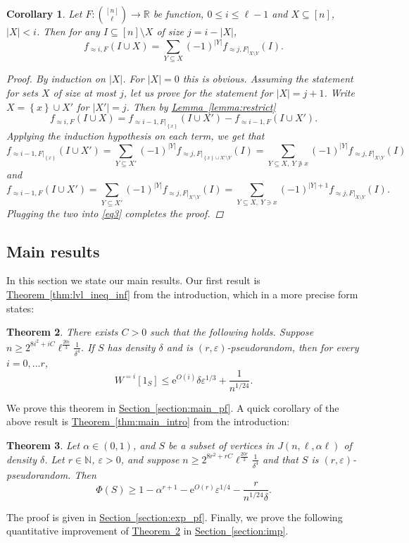 \documentclass[11pt]{article}
\newcommand{\expref}[2]{\texorpdfstring{\hyperref[#2]{#1~\ref{#2}}}{#1~\ref{#2}}}
\newtheorem{theorem}{Theorem}[section]
\newtheorem{corollary}[theorem]{Corollary}
\newcommand{\eee}{\mathrm e}
\newcommand\card[1]{\left| {#1} \right|}
\newcommand\set[1]{{\left\{ #1 \right\}}}
\newcommand\eps{\varepsilon}
\renewcommand\geq{\geqslant}
\renewcommand\leq{\leqslant}
\newcommand\expp[1]{\eee^{O({#1})}}
\newcommand\approxlvlfn[2]{{#1}_{\approx{#2}}}
\begin{document}
\begin{corollary}\label{corr:restriction}
Let $F\colon {[n]\choose \ell}\to\mathbb{R}$ be function, $0\leq i\leq \ell-1$
and $X\subseteq [n]$, $\card{X}<i$.
Then for any $I\subseteq [n]\setminus X$ of size $j = i-\card{X}$,
\[
\approxlvlfn{f}{i, F}(I\cup X)
= \sum\limits_{Y\subseteq X}{(-1)^{\card{Y}}
\approxlvlfn{f}{j,F|_{X\setminus Y}}(I)}.
\]
\begin{proof}
By induction on $\card{X}$. For $\card{X} = 0$ this is obvious. Assuming the statement
for %
sets $X$  %
of size at most $j$, let us
prove for the statement for $\card{X} = j+1$. Write $X = \set{x}\cup X'$ for $\card{X'} = j$. Then by \expref{Lemma}{lemma:restrict}
\begin{equation}\label{eq3}
\approxlvlfn{f}{i, F}(I\cup X)
=
\approxlvlfn{f}{i-1, F|_{\set{x}}}(I\cup X')
-\approxlvlfn{f}{i-1, F}(I\cup X').
\end{equation}
Applying the induction hypothesis on each term, we get that
\[
\approxlvlfn{f}{i-1, F|_{\set{x}}}(I\cup X')
= \sum\limits_{Y\subseteq X'}{(-1)^{\card{Y}}
\approxlvlfn{f}{j,F|_{\set{x} \cup X'\setminus Y}}(I)}
= \sum\limits_{Y\subseteq X, ~Y\not\ni x}{(-1)^{\card{Y}}
\approxlvlfn{f}{j,F|_{X \setminus Y}}(I)}
\]
and
\[
\approxlvlfn{f}{i-1, F}(I\cup X')
= \sum\limits_{Y\subseteq X'}{(-1)^{\card{Y}}
\approxlvlfn{f}{j,F|_{X'\setminus Y}}(I)}
= \sum\limits_{Y\subseteq X, ~Y\ni x}{(-1)^{\card{Y}+1}
\approxlvlfn{f}{j,F|_{X\setminus Y}}(I)}.
\]
Plugging the two into \eqref{eq3} completes the proof.
\end{proof}
\end{corollary}





\subsection{Main results}
In this section %
we state our main results.
%
%
Our first result is \expref{Theorem}{thm:lvl_ineq_inf} from the introduction, which in a more
precise form states:
\begin{theorem}\label{thm:main}
There exists $C>0$ such that the following holds. Suppose $n\geq 2^{8i^2+iC}\ell^{\frac{20i}{3}}\frac{1}{\delta^4}$.
If $S$ has density $\delta$ and is $(r,\eps)$-pseudorandom, then for every $i=0,...r$,
\[
W^{=i}[1_S] \leq \expp{i} \delta\eps^{1/3} + \frac{1}{n^{1/24}}.
\]
%
\end{theorem}
We prove this theorem in \expref{Section}{section:main_pf}.
A quick corollary of the above result is \expref{Theorem}{thm:main_intro} from the introduction:
\begin{theorem}\label{thm:main2}
Let $\alpha\in(0,1)$, and $S$ be a subset of vertices in $J(n,\ell,\alpha \ell)$
of density $\delta$. Let $r\in\mathbb{N}$, $\eps>0$, and suppose $n\geq 2^{8r^2+rC}\ell^{\frac{20r}{3}}\frac{1}{\delta^4}$
and that $S$ is $(r,\eps)$-pseudorandom. Then
\[
\Phi(S) \geq 1 - \alpha^{r+1} - \expp{r} \eps^{1/4} - \frac{r}{n^{1/24}\delta}.
\]
\end{theorem}
The proof is given in \expref{Section}{section:exp_pf}.
Finally, we prove the following quantitative improvement of \expref{Theorem}{thm:main} in \expref{Section}{section:imp}.
\end{document}
